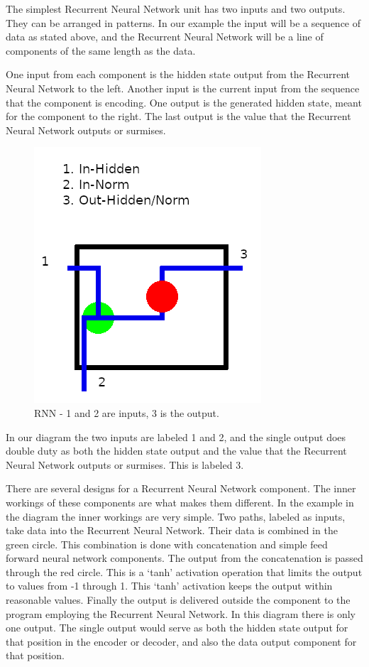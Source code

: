 The simplest Recurrent Neural Network unit has two inputs and two outputs. They can be arranged in patterns. In our example the input will be a sequence of data as stated above, and the Recurrent Neural Network will be a line of components of the same length as the data.

One input from each component is the hidden state output from the Recurrent Neural Network to the left. Another input is the current input from the sequence that the component is encoding. One output is the generated hidden state, meant for the component to the right. The last output is the value that the Recurrent Neural Network outputs or surmises. 

\begin{figure}[H]
	\begin{center}
	
	\includegraphics[scale=0.5]{diagram-rnn}
		
	\end{center}
	\caption[Recurrent Neural Network]{RNN - 1 and 2 are inputs, 3 is the output.}
	

\end{figure}

In our diagram the two inputs are labeled 1 and 2, and the single output does double duty as both the hidden state output and the value that the Recurrent Neural Network outputs or surmises. This is labeled 3.

There are several designs for a Recurrent Neural Network component. The inner workings of these components are what makes them different. In the example in the diagram the inner workings are very simple. Two paths, labeled as inputs, take data into the Recurrent Neural Network. Their data is combined in the green circle. This combination is done with concatenation and simple feed forward neural network components. The output from the concatenation is passed through the red circle. This is a `tanh' activation operation that limits the output to values from -1 through 1. This `tanh' activation keeps the output within reasonable values. Finally the output is delivered outside the component to the program employing the Recurrent Neural Network. In this diagram there is only one output. The single output would serve as both the hidden state output for that position in the encoder or decoder, and also the data output component for that position.



